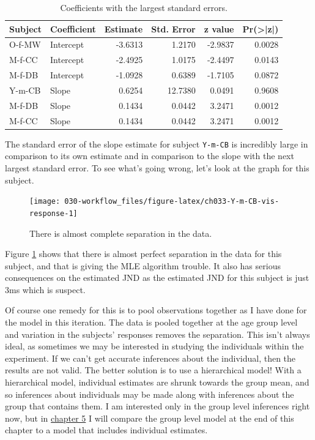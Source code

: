 \documentclass[11pt, oneside, openany]{scrbook}
\begin{document}
\begin{table}[!h]

\caption{\label{tab:ch033-Intensive-Oyster}Coefficients with the largest standard errors.}
\centering
\begin{tabular}[t]{llrrrr}
\toprule
Subject & Coefficient & Estimate & Std. Error & z value & Pr(>|z|)\\
\midrule
O-f-MW & Intercept & -3.6313 & 1.2170 & -2.9837 & 0.0028\\
M-f-CC & Intercept & -2.4925 & 1.0175 & -2.4497 & 0.0143\\
M-f-DB & Intercept & -1.0928 & 0.6389 & -1.7105 & 0.0872\\
Y-m-CB & Slope & 0.6254 & 12.7380 & 0.0491 & 0.9608\\
M-f-DB & Slope & 0.1434 & 0.0442 & 3.2471 & 0.0012\\
\addlinespace
M-f-CC & Slope & 0.1434 & 0.0442 & 3.2471 & 0.0012\\
\bottomrule
\end{tabular}
\end{table}

The standard error of the slope estimate for subject \texttt{Y-m-CB} is incredibly large in comparison to its own estimate and in comparison to the slope with the next largest standard error. To see what's going wrong, let's look at the graph for this subject.

\begin{figure}

{\centering \texttt{[image: 030-workflow\_files/figure-latex/ch033-Y-m-CB-vis-response-1]} 

}

\caption{There is almost complete separation in the data.}\label{fig:ch033-Y-m-CB-vis-response}
\end{figure}

Figure \ref{fig:ch033-Y-m-CB-vis-response} shows that there is almost perfect separation in the data for this subject, and that is giving the MLE algorithm trouble. It also has serious consequences on the estimated JND as the estimated JND for this subject is just 3ms which is suspect.

Of course one remedy for this is to pool observations together as I have done for the model in this iteration. The data is pooled together at the age group level and variation in the subjects' responses removes the separation. This isn't always ideal, as sometimes we may be interested in studying the individuals within the experiment. If we can't get accurate inferences about the individual, then the results are not valid. The better solution is to use a hierarchical model! With a hierarchical model, individual estimates are shrunk towards the group mean, and so inferences about individuals may be made along with inferences about the group that contains them. I am interested only in the group level inferences right now, but in \protect\hyperlink{predictive-inference}{chapter 5} I will compare the group level model at the end of this chapter to a model that includes individual estimates.
\end{document}
